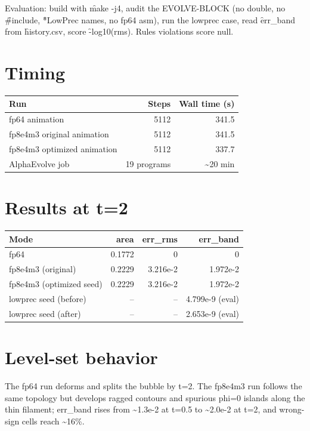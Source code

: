\documentclass{../style}
\begin{document}
Evaluation: build with \f{make -j4}, audit the EVOLVE-BLOCK (no double, no \f{\#include}, \f{*LowPrec}
names, no fp64 asm), run the lowprec case, read \f{err\_band} from \f{history.csv}, score
\f{-log10(rms)}. Rules violations score null.

\section{Timing}
\begin{center}
\begin{tabular}{@{}lrr@{}}
\toprule
Run & Steps & Wall time (s) \\
\midrule
fp64 animation & 5112 & 341.5 \\
fp8e4m3 original animation & 5112 & 341.5 \\
fp8e4m3 optimized animation & 5112 & 337.7 \\
AlphaEvolve job & 19 programs & \textasciitilde 20 min \\
\bottomrule
\end{tabular}
\end{center}

\section{Results at t=2}
\begin{center}
\begin{tabular}{@{}lrrr@{}}
\toprule
Mode & area & err\_rms & err\_band \\
\midrule
fp64 & 0.1772 & 0 & 0 \\
fp8e4m3 (original) & 0.2229 & 3.216e-2 & 1.972e-2 \\
fp8e4m3 (optimized seed) & 0.2229 & 3.216e-2 & 1.972e-2 \\
lowprec seed (before) & -- & -- & 4.799e-9 (eval) \\
lowprec seed (after) & -- & -- & 2.653e-9 (eval) \\
\bottomrule
\end{tabular}
\end{center}

\section{Level-set behavior}
The fp64 run deforms and splits the bubble by t=2. The fp8e4m3 run follows the same topology but
develops ragged contours and spurious phi=0 islands along the thin filament; err\_band rises from
\textasciitilde 1.3e-2 at t=0.5 to \textasciitilde 2.0e-2 at t=2, and wrong-sign cells reach \textasciitilde 16\%.
\end{document}
